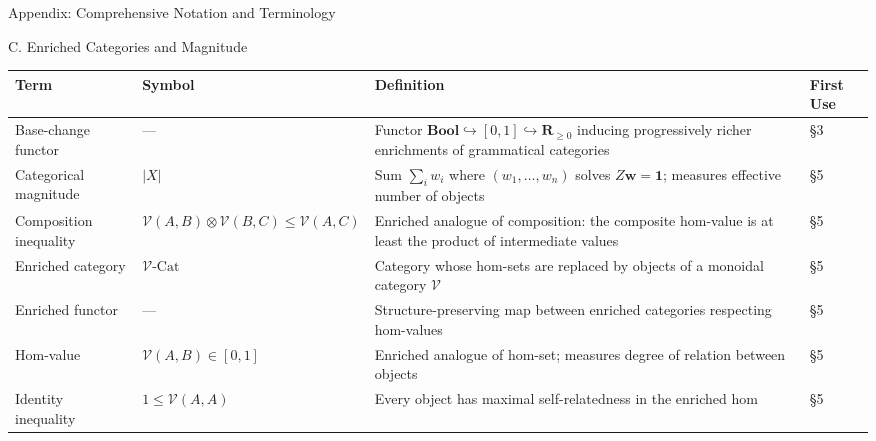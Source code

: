 \documentclass[
  ignorenonframetext,
]{beamer}
\newcounter{none} %
\begin{document}
\begin{frame}{Appendix: Comprehensive Notation and Terminology}
\begin{block}{C. Enriched Categories and Magnitude}
\protect{}\label{c.-enriched-categories-and-magnitude}
{\def\LTcaptype{none} %
\begin{longtable}[]{@{}
  >{\raggedright\arraybackslash}p{}
  >{\centering\arraybackslash}p{}
  >{\raggedright\arraybackslash}p{}
  >{\centering\arraybackslash}p{}@{}}
\toprule\noalign{}
\begin{minipage}[b]{\linewidth}\raggedright
Term
\end{minipage} & \begin{minipage}[b]{\linewidth}\centering
Symbol
\end{minipage} & \begin{minipage}[b]{\linewidth}\raggedright
Definition
\end{minipage} & \begin{minipage}[b]{\linewidth}\centering
First Use
\end{minipage} \\
\midrule\noalign{}
\endhead
Base-change functor & --- & Functor
\(\mathbf{Bool} \hookrightarrow [0,1] \hookrightarrow \mathbf{R}_{\geq 0}\)
inducing progressively richer enrichments of grammatical categories &
§3 \\
Categorical magnitude & \(\lvert X \rvert\) & Sum \(\sum_i w_i\) where
\((w_1, \ldots, w_n)\) solves \(Z \mathbf{w} = \mathbf{1}\); measures
effective number of objects & §5 \\
Composition inequality &
\(\mathcal{V}(A,B) \otimes \mathcal{V}(B,C) \leq \mathcal{V}(A,C)\) &
Enriched analogue of composition: the composite hom-value is at least
the product of intermediate values & §5 \\
Enriched category & \(\mathcal{V}\text{-Cat}\) & Category whose hom-sets
are replaced by objects of a monoidal category \(\mathcal{V}\) & §5 \\
Enriched functor & --- & Structure-preserving map between enriched
categories respecting hom-values & §5 \\
Hom-value & \(\mathcal{V}(A,B) \in [0,1]\) & Enriched analogue of
hom-set; measures degree of relation between objects & §5 \\
Identity inequality & \(1 \leq \mathcal{V}(A,A)\) & Every object has
maximal self-relatedness in the enriched hom & §5 \\

\end{longtable}}
\end{block}
\end{frame}
\end{document}
